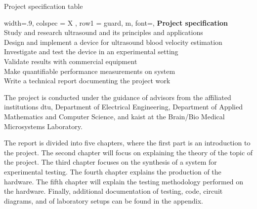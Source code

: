 \begin{table}[ht]
	\centering
	\caption{Project specification table}
	\label{tab:specifications}
	\begin{tblr}[]{%
			width=.9\textwidth,
			colspec = {X
			},
			row{1} = {guard, m, font=\small\bfseries},
		}
		\toprule
		\textbf{Project specification}									\\ \midrule
		Study and research ultrasound and its principles and applications	\\
		Design and implement a device for ultrasound blood velocity estimation	\\
		Investigate and test the device in an experimental setting		\\
		Validate results with commercial equipment 						\\
		Make quantifiable performance measurements on system			\\
		Write a technical report documenting the project work			\\ \bottomrule
	\end{tblr}

\end{table}

The project is conducted under the guidance of advisors from the affiliated institutions \Gls{dtu}, Department of Electrical Engineering, Department of Applied Mathematics and Computer Science, and \Gls{kaist} at the Brain/Bio Medical Microsystems Laboratory.

The report is divided into five chapters, where the first part is an introduction to the project. The second chapter will focus on explaining the theory of the topic of the project. The third chapter focuses on the synthesis of a system for experimental testing. The fourth chapter explains the production of the hardware. The fifth chapter will explain the testing methodology performed on the hardware. Finally, additional documentation of testing, code, circuit diagrams, and of laboratory setups can be found in the appendix.